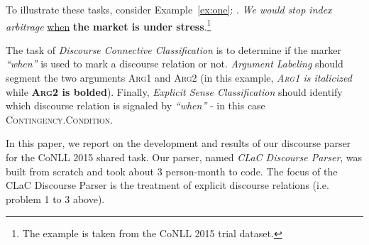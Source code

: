 \documentclass[11pt]{article}
\begin{document}
To illustrate these tasks, consider Example~\ref{ex:one}:
\ex. \label{ex:one} \textit{We would stop index arbitrage} \underline{when} \textbf{the market is under stress}.\footnote{The example is taken from the CoNLL 2015 trial dataset.}

The task of \textit{Discourse Connective Classification} is to determine if the marker \textit{``when''} is used to mark a discourse relation or not. \textit{Argument Labeling} should segment the two arguments \textsc{Arg1} and \textsc{Arg2} (in this example, \textit{\textsc{Arg1} is italicized} while \textbf{\textsc{Arg2} is bolded}). Finally, \textit{Explicit Sense Classification} should identify which discourse relation is signaled by \textit{``when''} - in this case \textsc{Contingency.Condition}.  



In this paper, we report on the development and results of our discourse parser for the CoNLL 2015 shared task. Our parser, named \textit{CLaC Discourse Parser}, was built from scratch and took about 3 person-month to code. The focus of the CLaC Discourse Parser is the treatment of explicit discourse relations (i.e. problem 1 to 3 above). 


\end{document}
